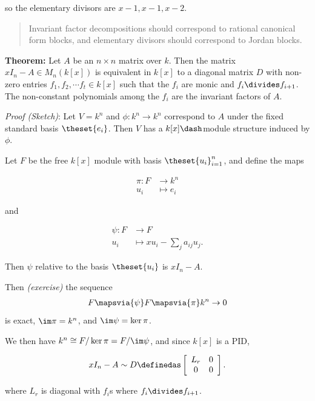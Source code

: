 so the elementary divisors are \(x-1, x-1, x-2\).

\begin{quote}
Invariant factor decompositions should correspond to rational canonical
form blocks, and elementary divisors should correspond to Jordan blocks.
\end{quote}

\textbf{Theorem:} Let \(A\) be an \(n\times n\) matrix over \(k\). Then
the matrix \(xI_n - A \in M_n(k[x])\) is equivalent in \(k[x]\) to a
diagonal matrix \(D\) with non-zero entries
\(f_1, f_2, \cdots f_t \in k[x]\) such that the \(f_i\) are monic and
\(f_i \divides f_{i+1}\). The non-constant polynomials among the \(f_i\)
are the invariant factors of \(A\).

\emph{Proof (Sketch)}: Let \(V = k^n\) and \(\phi: k^n \to k^n\)
correspond to \(A\) under the fixed standard basis \(\theset{e_i}\).
Then \(V\) has a \(k[x]\dash\)module structure induced by \(\phi\).

Let \(F\) be the free \(k[x]\) module with basis
\(\theset{u_i}_{i=1}^n\), and define the maps

\begin{align*}
\pi: F &\to k^n \\
u_i &\mapsto e_i
\end{align*}

and

\begin{align*}
\psi: F &\to F \\
u_i &\mapsto xu_i - \sum_j a_{ij} u_j
.\end{align*}

Then \(\psi\) relative to the basis \(\theset{u_i}\) is \(xI_n - A\).

Then \emph{(exercise)} the sequence
\begin{align*}
F \mapsvia{\psi} F \mapsvia{\pi} k^n \to 0
\end{align*} is exact, \(\im \pi = k^n\), and \(\im \psi = \ker \pi\).

We then have \(k^n \cong F/\ker \pi = F / \im \psi\), and since \(k[x]\)
is a PID,

\begin{align*}
xI_n - A \sim D \definedas
\left[\begin{array}{cc}
L_r & 0 \\
0 & 0
\end{array}\right]
.\end{align*}

where \(L_r\) is diagonal with \(f_i\)s where \(f_i \divides f_{i+1}\).

